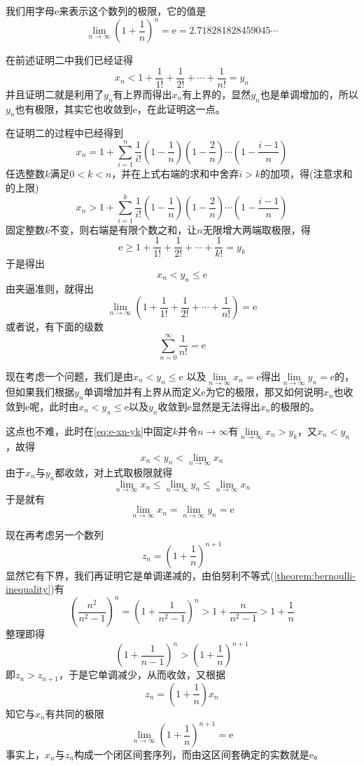 我们用字母$\mathrm{e}$来表示这个数列的极限，它的值是
\[ \lim_{n \to \infty} \left( 1+\frac{1}{n} \right)^n = \mathrm{e}= 2.718281828459045\cdots \]

在前述证明二中我们已经证得
\[ x_n < 1 + \frac{1}{1!} + \frac{1}{2!} + \cdots + \frac{1}{n!} = y_n \]
并且证明二就是利用了$y_n$有上界而得出$x_n$有上界的，显然$y_n$也是单调增加的，所以$y_n$也有极限，其实它也收敛到$\mathrm{e}$，在此证明这一点。

在证明二的过程中已经得到
\[ x_n = 1 + \sum_{i=1}^n \frac{1}{i!}\left( 1-\frac{1}{n} \right) \left( 1-\frac{2}{n} \right) \cdots \left( 1-\frac{i-1}{n} \right) \]
任选整数$k$满足$0<k<n$，并在上式右端的求和中舍弃$i>k$的加项，得(注意求和的上限)
\begin{equation}\label{eq:e-xn-yk}
 x_n > 1 + \sum_{i=1}^k \frac{1}{i!}\left( 1-\frac{1}{n} \right) \left( 1-\frac{2}{n} \right) \cdots \left( 1-\frac{i-1}{n} \right) 
\end{equation}
固定整数$k$不变，则右端是有限个数之和，让$n$无限增大两端取极限，得
\[ \mathrm{e} \geqslant 1 + \frac{1}{1!} + \frac{1}{2!} + \cdots + \frac{1}{k!} = y_k \]
于是得出
\[ x_n < y_n \leqslant \mathrm{e} \]
由夹逼准则，就得出
\[ \lim_{n \to \infty} \left( 1 + \frac{1}{1!} + \frac{1}{2!} + \cdots + \frac{1}{n!} \right) = \mathrm{e} \]
或者说，有下面的级数
\begin{equation}
  \label{eq:series-1-devide-by-n-fractor-is-e}
 \sum_{n=0}^{\infty} \frac{1}{n!} = \mathrm{e} 
\end{equation}

现在考虑一个问题，我们是由$x_n<y_n \leqslant \mathrm{e}$ 以及$\lim\limits_{n \to \infty} x_n = \mathrm{e}$得出$\lim\limits_{n \to \infty} y_{n}=\mathrm{e}$的，但如果我们根据$y_n$单调增加并有上界从而定义$\mathrm{e}$为它的极限，那又如何说明$x_n$也收敛到$\mathrm{e}$呢，此时由$x_n<y_n\leqslant \mathrm{e}$以及$y_n$收敛到$\mathrm{e}$显然是无法得出$x_n$的极限的。

这点也不难，此时在\autoref{eq:e-xn-yk}中固定$k$并令$n\to\infty$有$\lim\limits_{n \to \infty} x_n > y_k$，又$x_n<y_n$，故得
\[ x_n < y_n < \lim_{n \to \infty} x_n \]
由于$x_n$与$y_n$都收敛，对上式取极限就得
\[ \lim_{n \to \infty} x_n \leqslant \lim_{n \to \infty}y_n \leqslant \lim_{n \to \infty} x_n \]
于是就有
\[ \lim_{n \to \infty} x_n = \lim_{n \to \infty} y_n = \mathrm{e} \]

现在再考虑另一个数列
\[ z_n = \left( 1 + \frac{1}{n} \right)^{n+1} \]
显然它有下界，我们再证明它是单调递减的，由伯努利不等式(\autoref{theorem:bernoulli-inequality})有
\[ \left( \frac{n^2}{n^2-1} \right)^n = \left( 1 + \frac{1}{n^2-1} \right)^n > 1 + \frac{n}{n^2-1} > 1 + \frac{1}{n} \]
整理即得
\[ \left( 1 + \frac{1}{n-1} \right)^n > \left( 1+ \frac{1}{n} \right)^{n+1} \]
即$z_n>z_{n+1}$，于是它单调减少，从而收敛，又根据
\[ z_n=\left( 1+\frac{1}{n} \right)x_n \]
知它与$x_n$有共同的极限
\[ \lim_{n \to \infty} \left( 1 + \frac{1}{n} \right)^{n+1} = \mathrm{e} \]
事实上，$x_n$与$z_n$构成一个闭区间套序列，而由这区间套确定的实数就是$\mathrm{e}$。

